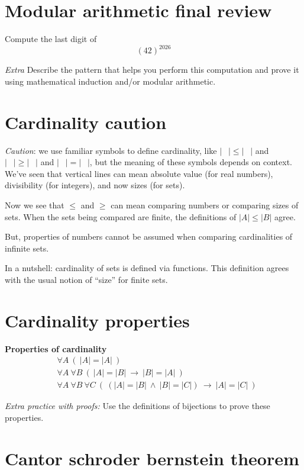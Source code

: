 \documentclass[12pt, oneside]{article}
\begin{document}
\vspace{200pt} \vfill
\section*{Modular arithmetic final review}


Compute the last digit of 
\[
    (42)^{2026}
\]

\vfill

{\it Extra} Describe the pattern that helps you perform this computation 
and prove it using mathematical induction and/or modular arithmetic. \vfill
\section*{Cardinality caution}


{\it Caution}: we use 
familiar symbols to define cardinality, like
$| \phantom{\cdots} | \leq | \phantom{\cdots} |$
and 
$| \phantom{\cdots} | \geq | \phantom{\cdots} |$
and 
$| \phantom{\cdots} | = | \phantom{\cdots} |$, 
but the meaning of these symbols depends on context.
We've seen that vertical lines can mean absolute
value (for real numbers), divisibility (for integers), 
and now sizes (for sets). 

Now we see that $\leq$ and $\geq$ can mean comparing
numbers or comparing sizes of sets. When the sets being 
compared are finite, the definitions 
of $|A| \leq |B|$ agree. 

But, properties of numbers cannot be assumed when comparing
cardinalities of infinite sets.

In a nutshell: cardinality of sets is defined via functions.
This definition agrees with the usual notion of ``size'' for 
finite sets. \vfill
\section*{Cardinality properties}


{\bf Properties of cardinality}
\begin{align*}
&\forall A ~ (~  |A| = |A| ~)\\
&\forall A ~ \forall B ~(~ |A| = |B|  ~\to ~ |B| = |A|~)\\
&\forall A ~ \forall B ~ \forall C~ (~ (|A| = |B| ~\wedge~ |B| = |C|) ~\to ~ |A| = |C|~)
\end{align*}

{\it Extra practice with proofs:} Use the definitions of bijections to prove these properties. \vfill
\section*{Cantor schroder bernstein theorem}
\end{document}
